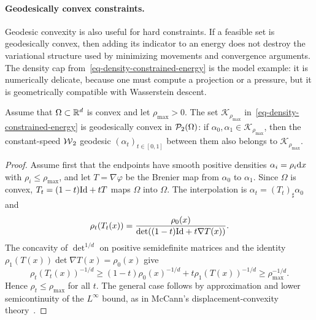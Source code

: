\paragraph{Geodesically convex constraints.}
\label{par-geodesically-convex-constraints}

Geodesic convexity is also useful for hard constraints. If a feasible set is geodesically convex, then adding its indicator to an energy does not destroy the variational structure used by minimizing movements and convergence arguments. The density cap from~\eqref{eq-density-constrained-energy} is the model example: it is numerically delicate, because one must compute a projection or a pressure, but it is geometrically compatible with Wasserstein descent.

\begin{proposition}\label{prop-density-cap-geodesic-convex}
	Assume that $\Omega\subset\mathbb{R}^d$ is convex and let $\rho_{\max}>0$. The set $\mathcal K_{\rho_{\max}}$ in~\eqref{eq-density-constrained-energy} is geodesically convex in $\mathcal{P}_2(\Omega)$: if $\alpha_0,\alpha_1\in\mathcal K_{\rho_{\max}}$, then the constant-speed $\operatorname{\mathcal{W}}_2$ geodesic $(\alpha_t)_{t\in[0,1]}$ between them also belongs to $\mathcal K_{\rho_{\max}}$.
\end{proposition}
\begin{proof}
	Assume first that the endpoints have smooth positive densities $\alpha_i=\rho_i\mathrm{d} x$ with $\rho_i\leq\rho_{\max}$, and let $T=\nabla\varphi$ be the Brenier map from $\alpha_0$ to $\alpha_1$. Since $\Omega$ is convex, $T_t=(1-t)\mathrm{Id}+tT$ maps $\Omega$ into $\Omega$. The interpolation is $\alpha_t=(T_t)_\sharp\alpha_0$ and
	\[
		\rho_t(T_t(x))=\frac{\rho_0(x)}{\det((1-t)\mathrm{Id}+t\nabla T(x))}.
	\]
	The concavity of $\det^{1/d}$ on positive semidefinite matrices and the identity $\rho_1(T(x))\det\nabla T(x)=\rho_0(x)$ give
	\[
		\rho_t(T_t(x))^{-1/d}
		\geq
		(1-t)\rho_0(x)^{-1/d}+t\rho_1(T(x))^{-1/d}
		\geq\rho_{\max}^{-1/d}.
	\]
	Hence $\rho_t\leq\rho_{\max}$ for all $t$. The general case follows by approximation and lower semicontinuity of the $L^\infty$ bound, as in McCann's displacement-convexity theory~\cite{mccann1997convexity}.
\end{proof}

